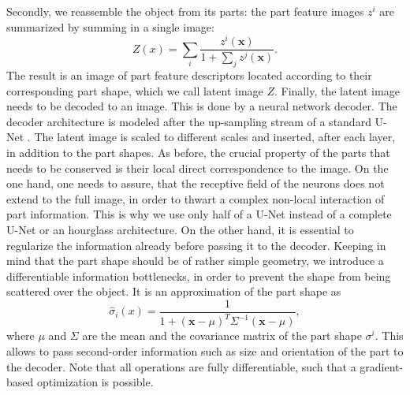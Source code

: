 		Secondly, we reassemble the object from its parts: the part feature images $z^i$ are summarized by summing in a single image:
		\begin{equation}
			Z(x) = \sum_i \frac{z^i(\mathbf{x})}{1 + \sum_j z^j(\mathbf{x})}.
		\end{equation}
		The result is an image of part feature descriptors located according to their corresponding part shape, which we call latent image $Z$.
		Finally, the latent image needs to be decoded to an image. This is done by a neural network decoder. The decoder architecture is modeled after the up-sampling stream of a standard U-Net \cite{ronneberger15unet}. The latent image is scaled to different scales  and inserted, after each layer, in addition to the part shapes. As before, the crucial property of the parts that needs to be conserved is their local direct correspondence to the image. On the one hand, one needs to assure, that the receptive field of the neurons does not extend to the full image, in order to thwart a complex non-local interaction of part information. This is why we use only half of a U-Net instead of a complete U-Net or an hourglass architecture.
		On the other hand, it is essential to regularize the information already before passing it to the decoder. Keeping in mind that the part shape should be of rather simple geometry, we introduce a differentiable information bottlenecks, in order to prevent the shape from being scattered over the object. It is an approximation of the part shape as
		\begin{equation}\label{eq:approx}
			\hat {\sigma}_i(x) = \frac{1}{1 + (\mathbf{x} -\mu)^T \Sigma^{-1} (\mathbf{x} - \mu)},
		\end{equation}
		where $\mu$ and $\Sigma$ are the mean and the covariance matrix of the part shape ${\sigma}^i$. This allows to pass second-order information such as size and orientation of the part to the decoder. Note that all operations are fully differentiable, such that a gradient-based optimization is possible.


